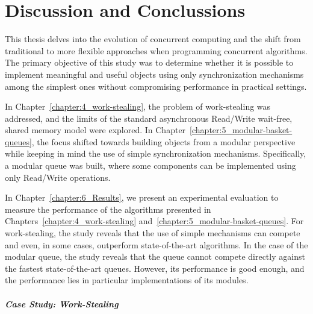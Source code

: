 \chapter{Discussion and Conclussions}

This thesis delves into the evolution of concurrent computing and the shift from traditional to more flexible approaches when programming concurrent algorithms. The primary objective of this study was to determine whether it is possible to implement meaningful and useful objects using only synchronization mechanisms among the simplest ones without compromising performance in practical settings.

In Chapter~\ref{chapter:4_work-stealing}, the problem of work-stealing was addressed, and the limits of the standard asynchronous Read/Write wait-free, shared memory model were explored. In Chapter~\ref{chapter:5_modular-basket-queues}, the focus shifted towards building objects from a modular perspective while keeping in mind the use of simple synchronization mechanisms. Specifically, a modular queue was built, where some components can be implemented using only Read/Write operations.


In Chapter~\ref{chapter:6_Results}, we present an experimental evaluation to measure the performance of the algorithms presented in Chapters~\ref{chapter:4_work-stealing} and~\ref{chapter:5_modular-basket-queues}. For work-stealing, the study reveals that the use of simple mechanisms can compete and even, in some cases, outperform state-of-the-art algorithms. In the case of the modular queue, the study reveals that the queue cannot compete directly against the fastest state-of-the-art queues. However, its performance is good enough, and the performance lies in particular implementations of its modules.


\paragraph{\label{sec:experiment-conclussions} Case Study: Work-Stealing}

